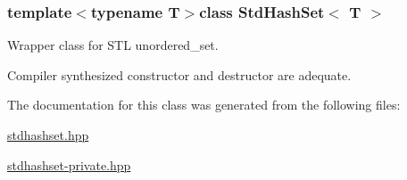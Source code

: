 \subsubsection*{template$<$typename T$>$class Std\-Hash\-Set$<$ T $>$}

Wrapper class for S\-T\-L unordered\-\_\-set. 

Compiler synthesized constructor and destructor are adequate. 

The documentation for this class was generated from the following files\-:\begin{DoxyCompactItemize}
\item 
\hyperlink{stdhashset_8hpp}{stdhashset.\-hpp}\item 
\hyperlink{stdhashset-private_8hpp}{stdhashset-\/private.\-hpp}\end{DoxyCompactItemize}
